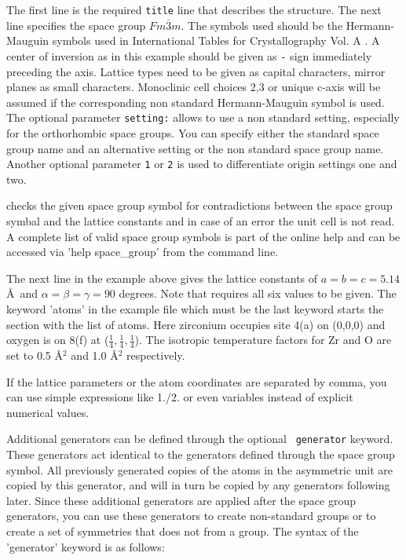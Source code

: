 The first line is the required {\tt title} line that describes the
structure. The next line specifies the space group
$Fm\overline{3}m$.  The symbols used should be the Hermann-Mauguin
symbols used in International Tables for Crystallography Vol.  A
\cite{tables}.  A center of inversion as in this example should be
given as {\tt -} sign immediately preceding the axis. Lattice types need
to be given as capital characters, mirror planes as small
characters.  Monoclinic cell choices 2,3 or unique c-axis will be
assumed if the corresponding non standard Hermann-Mauguin symbol is
used. The optional parameter {\tt setting:} allows to use a 
non standard setting, especially for the orthorhombic space groups. 
You can specify either the standard space group name and an 
alternative setting or the non standard space group name.
Another optional parameter {\tt 1} or {\tt 2} is used to differentiate
origin settings one and two. 

\Discus checks the given space group symbol for
contradictions between the space group symbal and the lattice 
constants and in case of an error
the unit cell is not read.  A complete list of valid space group
symbols is part of the online help and can be accessed via 'help
space\_group' from the \Discus command line.  

The next line in the
example above gives the lattice constants of $a=b=c=5.14$\AA \ and
$\alpha=\beta=\gamma=90$ degrees.  Note that \Discus requires
all six values to be given.  The keyword 'atoms' in the example file
which must be the last keyword starts the section with the list of
atoms.  Here zirconium occupies site 4(a) on (0,0,0) and oxygen is
on 8(f) at ($\frac{1}{4}, \frac{1}{4}, \frac{1}{4}$).  The isotropic
temperature factors for Zr and O are set to 0.5 \AA$^{2}$ and 1.0
\AA$^{2}$ respectively. \par

If the lattice parameters or the atom coordinates are separated
by comma, you can use simple expressions like 1./2. or even 
variables instead of explicit numerical values. \par

Additional generators can be defined through the optional {\tt
generator} keyword.  These generators act identical to the
generators defined through the space group symbol.  All previously
generated copies of the atoms in the asymmetric unit are copied by
this generator, and will in turn be copied by any generators
following later.  Since these additional generators are applied
after the space group generators, you can use these generators to
create non-standard groups or to create a set of symmetries that
does not from a group. The syntax of the 'generator' keyword is as
follows:

